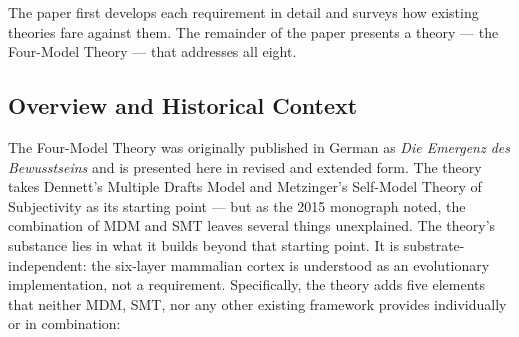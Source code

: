 \documentclass[12pt]{article}
\begin{document}
The paper first develops each requirement in detail and surveys how existing theories fare against them. The remainder of the paper presents a theory --- the Four-Model Theory --- that addresses all eight.


\subsection{Overview and Historical Context}


The Four-Model Theory was originally published in German as \emph{Die Emergenz des Bewusstseins} \citep{Gruber2015} and is presented here in revised and extended form. The theory takes Dennett's Multiple Drafts Model \citep{Dennett1991} and Metzinger's Self-Model Theory of Subjectivity \citep{Metzinger2003,Metzinger2009} as its starting point --- but as the 2015 monograph noted, the combination of MDM and SMT leaves several things unexplained. The theory's substance lies in what it builds beyond that starting point. It is substrate-independent: the six-layer mammalian cortex is understood as an evolutionary implementation, not a requirement. Specifically, the theory adds five elements that neither MDM, SMT, nor any other existing framework provides individually or in combination:
\end{document}
